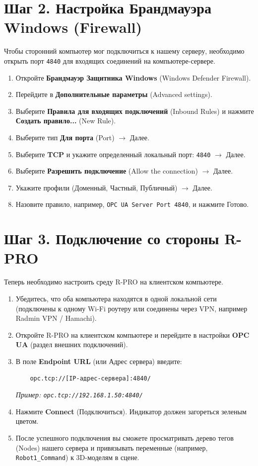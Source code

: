 \documentclass[12pt,a4paper]{article}
\begin{document}
\section{Шаг 2. Настройка Брандмауэра Windows (Firewall)}
Чтобы сторонний компьютер мог подключиться к нашему серверу, необходимо открыть порт \texttt{4840} для входящих соединений на компьютере-сервере.
\begin{enumerate}
    \item Откройте \textbf{Брандмауэр Защитника Windows} (Windows Defender Firewall).
    \item Перейдите в \textbf{Дополнительные параметры} (Advanced settings).
    \item Выберите \textbf{Правила для входящих подключений} (Inbound Rules) и нажмите \textbf{Создать правило...} (New Rule).
    \item Выберите тип \textbf{Для порта} (Port) $\rightarrow$ Далее.
    \item Выберите \textbf{TCP} и укажите определенный локальный порт: \texttt{4840} $\rightarrow$ Далее.
    \item Выберите \textbf{Разрешить подключение} (Allow the connection) $\rightarrow$ Далее.
    \item Укажите профили (Доменный, Частный, Публичный) $\rightarrow$ Далее.
    \item Назовите правило, например, \texttt{OPC UA Server Port 4840}, и нажмите Готово.
\end{enumerate}

\section{Шаг 3. Подключение со стороны R-PRO}
Теперь необходимо настроить среду R-PRO на клиентском компьютере.
\begin{enumerate}
    \item Убедитесь, что оба компьютера находятся в одной локальной сети (подключены к одному Wi-Fi роутеру или соединены через VPN, например Radmin VPN / Hamachi).
    \item Откройте R-PRO на клиентском компьютере и перейдите в настройки \textbf{OPC UA} (раздел внешних подключений).
    \item В поле \textbf{Endpoint URL} (или Адрес сервера) введите:
    \begin{lstlisting}
    opc.tcp://[IP-адрес-сервера]:4840/
    \end{lstlisting}
    \textit{Пример: \texttt{opc.tcp://192.168.1.50:4840/}}
    \item Нажмите \textbf{Connect} (Подключиться). Индикатор должен загореться зеленым цветом.
    \item После успешного подключения вы сможете просматривать дерево тегов (Nodes) нашего сервера и привязывать переменные (например, \texttt{Robot1\_Command}) к 3D-моделям в сцене.
\end{enumerate}
\end{document}
